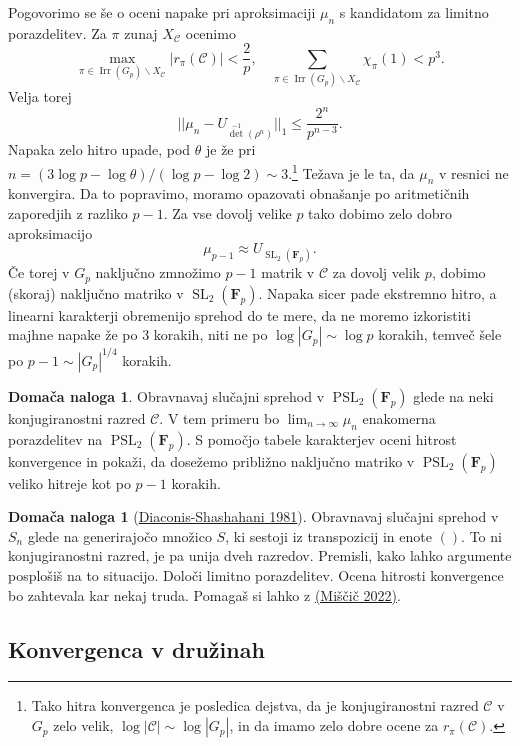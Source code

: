 \documentclass[11pt]{book}
\def\conclass{\mathcal{C}}
\def\FF{\mathbf{F}}
\DeclareMathOperator\Irr{Irr}
\DeclareMathOperator\SL{SL}
\DeclareMathOperator\PSL{PSL}
\theoremstyle{definition}
\theoremstyle{zgled}
\theoremstyle{zgledbrezstevilke}
\theoremstyle{odprtproblem}
\theoremstyle{domacanaloga}
\newtheorem{domacanaloga}[theorem]{Domača naloga}
\theoremstyle{izrek}
\begin{document}
Pogovorimo se še o oceni napake pri aproksimaciji $\mu_n$ s kandidatom za limitno porazdelitev. Za $\pi$ zunaj $X_{\conclass}$ ocenimo
\[
    \max_{\pi \in \Irr(G_p) \backslash X_{\conclass}} |r_{\pi}(\conclass)| < \frac{2}{p}, \quad
    \sum_{\pi \in \Irr(G_p) \backslash X_{\conclass}} \chi_{\pi}(1)
    < p^3.
\]
Velja torej
\[
    || \mu_n - U_{\det^{-1}(\rho^n)} ||_1
    \leq
    \frac{2^n}{p^{n-3}}.
\]
Napaka zelo hitro upade, pod $\theta$ je že pri $n = (3 \log p - \log \theta) / (\log p - \log 2) \sim 3$.\footnote{Tako hitra konvergenca je posledica dejstva, da je konjugiranostni razred $\conclass$ v $G_p$ zelo velik, $\log |\conclass| \sim \log |G_p|$, in da imamo zelo dobre ocene za $r_{\pi}(\conclass)$.} Težava je le ta, da $\mu_n$ v resnici ne konvergira. Da to popravimo, moramo opazovati obnašanje po aritmetičnih zaporedjih z razliko $p-1$. Za vse dovolj velike $p$ tako dobimo zelo dobro aproksimacijo
\[
    \mu_{p-1} \approx U_{\SL_2(\FF_p)}.
\]
Če torej v $G_p$ naključno zmnožimo $p-1$ matrik v $\conclass$ za dovolj velik $p$, dobimo (skoraj) naključno matriko v $\SL_2(\FF_p)$. Napaka sicer pade ekstremno hitro, a linearni karakterji obremenijo sprehod do te mere, da ne moremo izkoristiti majhne napake že po $3$ korakih, niti ne po $\log |G_p| \sim \log p$ korakih, temveč šele po $p-1 \sim |G_p|^{1/4}$ korakih. 

\begin{domacanaloga}
Obravnavaj slučajni sprehod v $\PSL_2(\FF_p)$ glede na neki konjugiranostni razred $\conclass$. V tem primeru bo $\lim_{n \to \infty} \mu_n$ enakomerna porazdelitev na $\PSL_2(\FF_p)$. S pomočjo tabele karakterjev oceni hitrost konvergence in pokaži, da dosežemo približno naključno matriko v $\PSL_2(\FF_p)$ veliko hitreje kot po $p-1$ korakih.
\end{domacanaloga}

\begin{domacanaloga}[\href{https://link.springer.com/article/10.1007/BF00535487}{Diaconis-Shashahani 1981}]
Obravnavaj slučajni sprehod v $S_n$ glede na generirajočo množico $S$, ki sestoji iz transpozicij in enote $()$. To ni konjugiranostni razred, je pa unija dveh razredov. Premisli, kako lahko argumente posplošiš na to situacijo. Določi limitno porazdelitev. Ocena hitrosti konvergence bo zahtevala kar nekaj truda. Pomagaš si lahko z \href{https://repozitorij.uni-lj.si/IzpisGradiva.php?id=139856&lang=eng}{(Miščič 2022)}.
\end{domacanaloga}

\subsection{Konvergenca v družinah}
\end{document}
